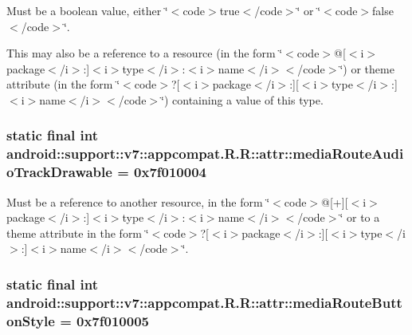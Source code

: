 Must be a boolean value, either \char`\"{}$<$code$>$true$<$/code$>$\char`\"{} or \char`\"{}$<$code$>$false$<$/code$>$\char`\"{}. 

This may also be a reference to a resource (in the form \char`\"{}$<$code$>$@\mbox{[}$<$i$>$package$<$/i$>$:\mbox{]}$<$i$>$type$<$/i$>$:$<$i$>$name$<$/i$>$$<$/code$>$\char`\"{}) or theme attribute (in the form \char`\"{}$<$code$>$?\mbox{[}$<$i$>$package$<$/i$>$:\mbox{]}\mbox{[}$<$i$>$type$<$/i$>$:\mbox{]}$<$i$>$name$<$/i$>$$<$/code$>$\char`\"{}) containing a value of this type. \hypertarget{classandroid_1_1support_1_1v7_1_1appcompat_1_1_r_1_1attr_ff916fd5b39893d4a7548aa25eec94d4}{
\subsubsection[{mediaRouteAudioTrackDrawable}]{\setlength{\rightskip}{0pt plus 5cm}static final int android::support::v7::appcompat.R.R::attr::mediaRouteAudioTrackDrawable = 0x7f010004}}
\label{classandroid_1_1support_1_1v7_1_1appcompat_1_1_r_1_1attr_ff916fd5b39893d4a7548aa25eec94d4}


Must be a reference to another resource, in the form \char`\"{}$<$code$>$@\mbox{[}+\mbox{]}\mbox{[}$<$i$>$package$<$/i$>$:\mbox{]}$<$i$>$type$<$/i$>$:$<$i$>$name$<$/i$>$$<$/code$>$\char`\"{} or to a theme attribute in the form \char`\"{}$<$code$>$?\mbox{[}$<$i$>$package$<$/i$>$:\mbox{]}\mbox{[}$<$i$>$type$<$/i$>$:\mbox{]}$<$i$>$name$<$/i$>$$<$/code$>$\char`\"{}. \hypertarget{classandroid_1_1support_1_1v7_1_1appcompat_1_1_r_1_1attr_6d178bfce739f026d801c946a0284e13}{
\subsubsection[{mediaRouteButtonStyle}]{\setlength{\rightskip}{0pt plus 5cm}static final int android::support::v7::appcompat.R.R::attr::mediaRouteButtonStyle = 0x7f010005}}
\label{classandroid_1_1support_1_1v7_1_1appcompat_1_1_r_1_1attr_6d178bfce739f026d801c946a0284e13}


